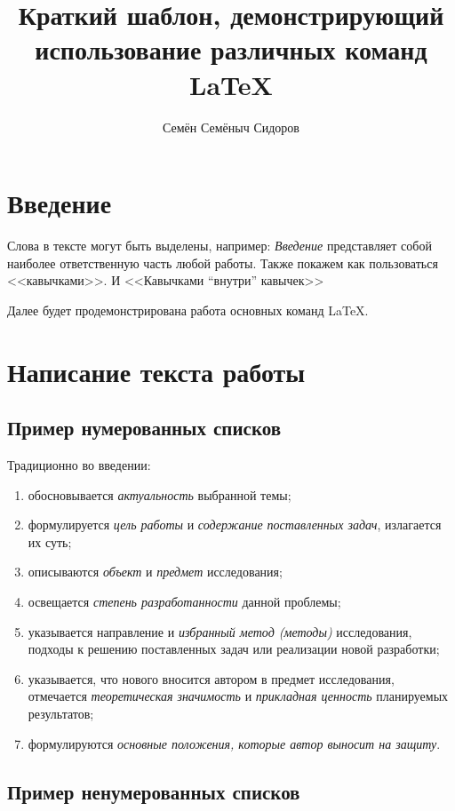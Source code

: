 \documentclass[PI]{LabHSE}
\title{Краткий шаблон, демонстрирующий использование различных команд \LaTeX}
\author{Семён Семёныч Сидоров}
\begin{document}
\maketitle

\chapter*{Введение}

Слова в тексте могут быть выделены, например: \emph{Введение} представляет собой наиболее ответственную часть любой работы.
Также покажем как пользоваться <<кавычками>>. И <<Кавычками ``внутри'' кавычек>>

Далее будет продемонстрирована работа основных команд \LaTeX{}.

\chapter{Написание текста работы}

\section{Пример нумерованных списков}

Традиционно во введении:
\begin{enumerate}
	\item  обосновывается \emph{актуальность} выбранной темы;
	\item  формулируется \emph{цель работы} и \emph{содержание поставленных задач}, излагается их суть;
	\item  описываются \emph{объект} и \emph{предмет} исследования;
	\item  освещается \emph{степень разработанности} данной проблемы;
	\item  указывается направление и \emph{избранный метод (методы)} исследования, подходы к решению поставленных задач или реализации новой разработки;
	\item  указывается, что нового вносится автором в предмет исследования, отмечается \emph{теоретическая значимость} и \emph{прикладная ценность} планируемых результатов;
	\item  формулируются \emph{основные положения, которые автор выносит на защиту}.
\end{enumerate}

\section{Пример ненумерованных списков}
\end{document}
